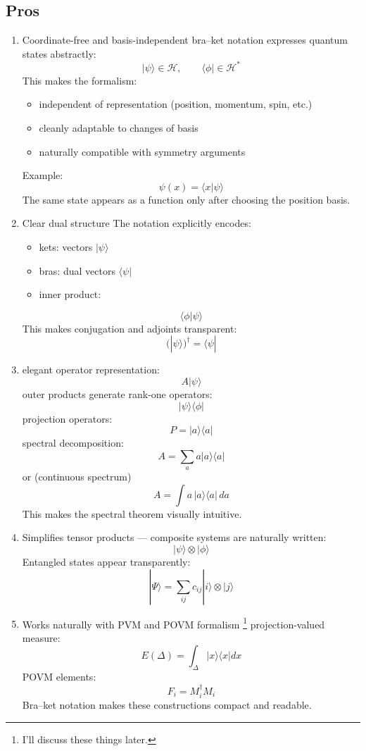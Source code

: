 \subsection{ Pros}
\begin{enumerate}
   \item
 Coordinate-free and basis-independent
bra--ket notation expresses quantum states abstractly:
\[|\psi\rangle \in \mathcal{H}, \qquad \langle \phi| \in \mathcal{H}^*\]
This makes the formalism:
\begin{itemize}
\item
  independent of representation (position, momentum, spin, etc.)
\item
  cleanly adaptable to changes of basis
\item
  naturally compatible with symmetry arguments
\end{itemize}
Example:
\[\psi(x) = \langle x|\psi\rangle\]
The same state appears as a function only after choosing the position
basis.
\item
 Clear dual structure
  The notation explicitly encodes:
\begin{itemize}
\item
  kets: vectors \(|\psi\rangle\)
\item
  bras: dual vectors \(\langle\psi|\)
\item
  inner product:
\end{itemize}
\[\langle \phi | \psi \rangle\]
This makes conjugation and adjoints transparent:
\[(|\psi\rangle)^\dagger = \langle \psi|\]
\item
elegant operator representation:
\[A|\psi\rangle\]
outer products generate rank-one operators:
\[|\psi\rangle\langle\phi|\]
projection operators:
\[P = |a\rangle\langle a|\]
spectral decomposition:
\[A = \sum_a a |a\rangle\langle a|\]
or (continuous spectrum)
\[A = \int a\, |a\rangle\langle a|\, da\]
This makes the spectral theorem visually intuitive.
\item
Simplifies tensor products ---
composite systems are naturally written:
\[|\psi\rangle \otimes |\phi\rangle\]
Entangled states appear transparently:
\[|\Psi\rangle = \sum_{ij} c_{ij} |i\rangle \otimes |j\rangle\]
\item
Works naturally with PVM and POVM formalism \footnote{ I'll discuss 
   these things later.     }
projection-valued measure:
\[E(\Delta) = \int_\Delta |x\rangle\langle x| dx\]
POVM elements:
\[F_i = M_i^\dagger M_i\]
Bra--ket notation makes these constructions compact and readable.
\end{enumerate}

